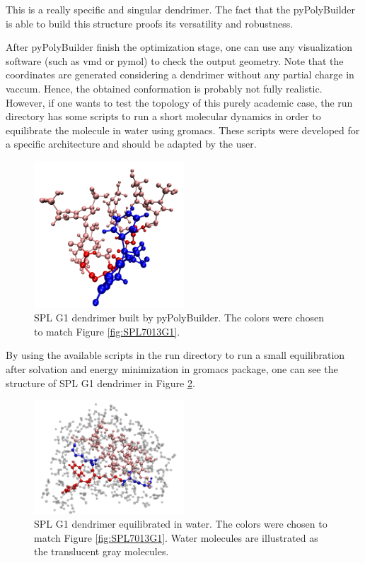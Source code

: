 This is a really specific and singular dendrimer.
The fact that the pyPolyBuilder is able to build this structure proofs its versatility and robustness.

After pyPolyBuilder finish the optimization stage, one can use any visualization software (such as vmd or pymol) to check the output geometry. 
Note that the coordinates are generated considering a dendrimer without any partial charge in vaccum.
Hence, the obtained conformation is probably not fully realistic.
However, if one wants to test the topology of this purely academic case, the run directory has some scripts to run a short molecular dynamics in order to equilibrate the molecule in water using gromacs.
These scripts were developed for a specific architecture and should be adapted by the user.

\begin{figure}
    \centering
    \includegraphics[width=0.5\textwidth]{SPL7013/SPL1.pdf}
    \caption{SPL G1 dendrimer built by pyPolyBuilder.
             The colors were chosen to match Figure \ref{fig:SPL7013G1}.}
    \label{fig:SPL7013PPB}
\end{figure}

By using the available scripts in the run directory to run a small equilibration after solvation and energy minimization in gromacs package, one can see the structure of SPL G1 dendrimer in Figure \ref{fig:SPL7013SOL}.

\begin{figure}
    \centering
    \includegraphics[width=0.5\textwidth]{SPL7013/SPLSOL.pdf}
    \caption{SPL G1 dendrimer equilibrated in water.
             The colors were chosen to match Figure \ref{fig:SPL7013G1}.
             Water molecules are illustrated as the translucent gray molecules.}
    \label{fig:SPL7013SOL}
\end{figure}

